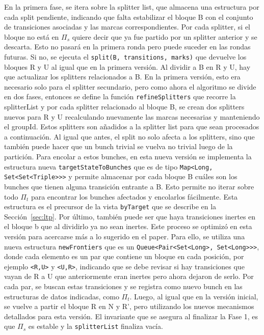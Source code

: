 En la primera fase, se itera sobre la splitter list, que almacena una estructura por cada split pendiente, indicando que falta estabilizar el bloque B con el conjunto de transiciones asociadas y las marcas correspondientes. Por cada splitter, si el bloque no está en $\Pi_s$ quiere decir que ya fue partido por un splitter anterior y se descarta. Esto no pasará en la primera ronda pero puede suceder en las rondas futuras. Si no, se ejecuta el \texttt{split(B, transitions, marks)} que devuelve los bloques R y U al igual que en la primera versión. Al dividir a B en R y U, hay que actualizar los splitters relacionados a B. En la primera versión, esto era necesario solo para el splitter secundario, pero como ahora el algoritmo se divide en dos fases, entonces se define la función \texttt{refineSplitters} que recorre la splitterList y por cada splitter relacionado al bloque B, se crean dos splitters nuevos para R y U recalculando nuevamente las marcas necesarias y manteniendo el groupId. Estos splitters son añadidos a la splitter list para que sean procesados a continuación. Al igual que antes, el split no solo afecta a los splitters, sino que también puede hacer que un bunch trivial se vuelva no trivial luego de la partición. Para encolar a estos bunches, en esta nueva versión se implementa la estructura nueva \texttt{targetStateToBunches} que es de tipo \texttt{Map\textless Long, Set\textless Set\textless Triple\textgreater\textgreater\textgreater} y permite almacenar por cada bloque B cuáles son los bunches que tienen alguna transición entrante a B. Esto permite no iterar sobre todo $\Pi_t$ para encontrar los bunches afectados y encolarlos fácilmente. Esta estructura es el precursor de la vista \texttt{byTarget} que se describe en la Sección~\ref{sec:ltp}. Por último, también puede ser que haya transiciones inertes en el bloque b que al dividirlo ya no sean inertes. Este proceso se optimizó en esta versión para acercarse más a lo sugerido en el paper. Para ello, se utiliza una nueva estructura \texttt{newFrontiers} que es un \texttt{Queue\textless Pair\textless Set\textless Long\textgreater, Set\textless Long\textgreater\textgreater\textgreater}, donde cada elemento es un par que contiene un bloque en cada posición, por ejemplo \texttt{\textless R,U\textgreater} y \texttt{\textless U,R\textgreater}, indicando que se debe revisar si hay transiciones que vayan de R a U que anteriormente eran inertes pero ahora dejaron de serlo. Por cada par, se buscan estas transiciones y se registra como nuevo bunch en las estructuras de datos indicadas, como $\Pi_t$. Luego, al igual que en la versión inicial, se vuelve a partir el bloque R en N y R', pero utilizando los nuevos mecanismos detallados para esta versión. El invariante que se asegura al finalizar la Fase 1, es que $\Pi_s$ es estable y la \texttt{splitterList} finaliza vacía. 

